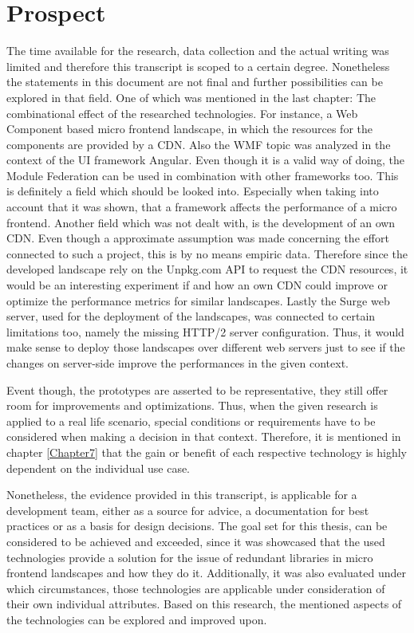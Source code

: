 \chapter{Prospect} %
\label{Chapter9}


The time available for the research, data collection and the actual writing was limited and therefore this transcript is scoped to a certain degree. Nonetheless the statements in this document are not final and further possibilities can be explored in that field. One of which was mentioned in the last chapter: The combinational effect of the researched technologies. For instance, a Web Component based micro frontend landscape, in which the resources for the components are provided by a CDN. Also the WMF topic was analyzed in the context of the UI framework Angular. Even though it is a valid way of doing, the Module Federation can be used in combination with other frameworks too. This is definitely a field which should be looked into. Especially when taking into account that it was shown, that a framework affects the performance of a micro frontend. 
Another field which was not dealt with, is the development of an own CDN. Even though a approximate assumption was made concerning the effort connected to such a project, this is by no means empiric data. Therefore since the developed landscape rely on the Unpkg.com API to request the CDN resources, it would be an interesting experiment if and how an own CDN could improve or optimize the performance metrics for similar landscapes.
Lastly the Surge web server, used for the deployment of the landscapes, was connected to certain limitations too, namely the missing HTTP/2 server configuration. Thus, it would make sense to deploy those landscapes over different web servers just to see if the changes on server-side improve the performances in the given context.

Event though, the prototypes are asserted to be representative, they still offer room for improvements and optimizations. Thus, when the given research is applied to a real life scenario, special conditions or requirements have to be considered when making a decision in that context. Therefore, it is mentioned in chapter \ref{Chapter7} that the gain or benefit of each respective technology is highly dependent on the individual use case. 

Nonetheless, the evidence provided in this transcript, is applicable for a development team, either as a source for advice, a documentation for best practices or as a basis for design decisions. The goal set for this thesis, can be considered to be achieved and exceeded, since it was showcased that the used technologies provide a solution for the issue of redundant libraries in micro frontend landscapes and how they do it. Additionally, it was also evaluated under which circumstances, those technologies are applicable under consideration of their own individual attributes. Based on this research, the mentioned aspects of the technologies can be explored and improved upon.




